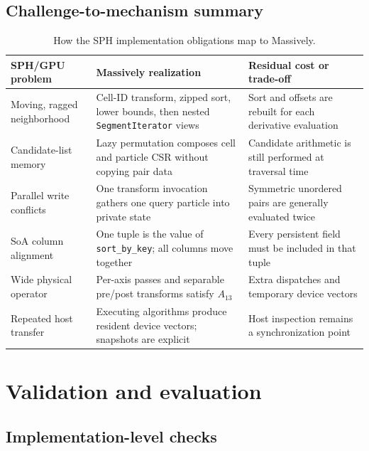 \documentclass[a4paper,10pt]{article}
\newcommand{\code}[1]{\texttt{#1}}
\begin{document}
\subsection{Challenge-to-mechanism summary}

\begin{table}[ht]
  \centering
  \caption{How the SPH implementation obligations map to Massively.}
  \label{tab:solutions}
  \begin{tabular}{p{}p{}p{}}
    \toprule
    SPH/GPU problem & Massively realization & Residual cost or trade-off \\
    \midrule
    Moving, ragged neighborhood
      & Cell-ID transform, zipped sort, lower bounds, then nested
        \code{SegmentIterator} views
      & Sort and offsets are rebuilt for each derivative evaluation \\
    Candidate-list memory
      & Lazy permutation composes cell and particle CSR without copying pair data
      & Candidate arithmetic is still performed at traversal time \\
    Parallel write conflicts
      & One transform invocation gathers one query particle into private state
      & Symmetric unordered pairs are generally evaluated twice \\
    SoA column alignment
      & One tuple is the value of \code{sort\_by\_key}; all columns move together
      & Every persistent field must be included in that tuple \\
    Wide physical operator
      & Per-axis passes and separable pre/post transforms satisfy $A_{13}$
      & Extra dispatches and temporary device vectors \\
    Repeated host transfer
      & Executing algorithms produce resident device vectors; snapshots are explicit
      & Host inspection remains a synchronization point \\
    \bottomrule
  \end{tabular}
\end{table}

\section{Validation and evaluation}

\subsection{Implementation-level checks}
\end{document}
